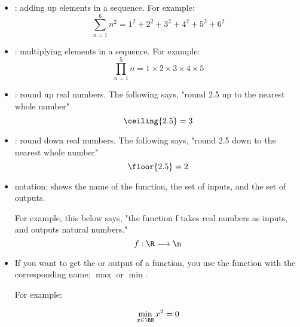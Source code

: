     \begin{itemize}
    
        \item {}: adding up elements in a sequence. For example:
            \begin{equation}
                \sum_{n=1}^{6} n^2 = 1^2+2^2+3^2+4^2+5^2+6^2
            \end{equation}
        
        \item {}: multiplying elements in a sequence. For example:
            \begin{equation}
                \prod_{n=1}^{5} n = 1 \times 2 \times 3 \times 4 \times 5
            \end{equation}
            
        \item {}: round up real numbers. The following says, "round 2.5 up to the nearest whole number"
            \begin{equation}
                \ceiling{2.5} = 3
            \end{equation}
            
        \item {}: round down real numbers. The following says, "round 2.5 down to the nearest whole number"
            \begin{equation}
                \floor{2.5} = 2
            \end{equation}
        
        \item {} notation: shows the name of the function, the set of inputs, and the set of outputs. 
        
        For example, this below says, "the function f takes real numbers as inputs, and outputs natural numbers."
            \begin{equation}
                f: \R \longrightarrow \n
            \end{equation}
            
        \item If you want to get the  or  output of a function, you use the function with the corresponding name: $\max$ or $\min$.
        
        For example:
        
            \begin{equation}
                \min_{x \in \RR} x^2=0
            \end{equation}
            

\end{itemize}
